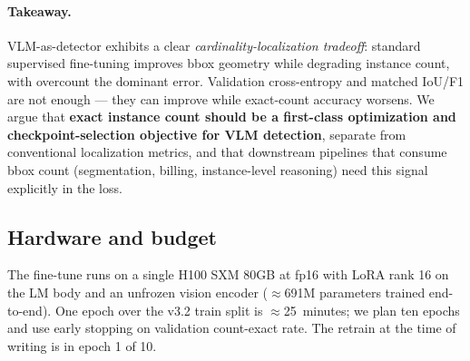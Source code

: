 \paragraph{Takeaway.} VLM-as-detector exhibits a clear
\emph{cardinality-localization tradeoff}: standard supervised fine-tuning
improves bbox geometry while degrading instance count, with overcount the
dominant error. Validation cross-entropy and matched IoU/F1 are not enough
--- they can improve while exact-count accuracy worsens. We argue that
\textbf{exact instance count should be a first-class optimization and
checkpoint-selection objective for VLM detection}, separate from
conventional localization metrics, and that downstream pipelines that
consume bbox count (segmentation, billing, instance-level reasoning) need
this signal explicitly in the loss.

\subsection{Hardware and budget}

The fine-tune runs on a single H100 SXM 80GB at fp16 with LoRA rank 16 on
the LM body and an unfrozen vision encoder ($\approx$691M parameters trained
end-to-end). One epoch over the v3.2 train split is $\approx$25~minutes;
we plan ten epochs and use early stopping on validation count-exact rate.
The retrain at the time of writing is in epoch 1 of 10.
